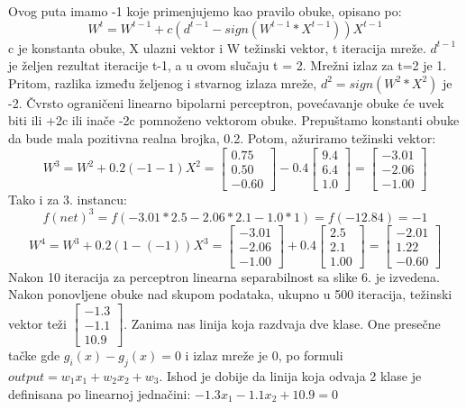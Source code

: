 \documentclass[fontsize=11bp, paper=a4]{scrarticle}
\begin{document}
Ovog puta imamo -1 koje primenjujemo kao pravilo obuke, opisano po:
$$
\boxed{
W^t = W^{t-1} + c(d^{t-1} - sign(W^{t-1}*X^{t-1})) X^{t-1}
}
$$
c je konstanta obuke, X ulazni vektor i W težinski vektor, t iteracija mreže. $d^{t-1}$ je željen rezultat iteracije t-1, a u ovom slučaju t = 2. Mrežni izlaz za t=2 je 1. Pritom, razlika između željenog i stvarnog izlaza mreže, $d^2 = sign(W^2 * X^2)$ je -2. Čvrsto ograničeni linearno bipolarni perceptron, povećavanje obuke će uvek biti ili +2c ili inače -2c pomnoženo vektorom obuke. Prepuštamo konstanti obuke da bude mala pozitivna realna brojka, 0.2. Potom, ažuriramo težinski vektor:
$$
W^3 = W^2 + 0.2 (-1 - 1)X^2 = \begin{bmatrix} 0.75 \\ 0.50 \\ -0.60 \end{bmatrix} - 0.4 \begin{bmatrix} 9.4 \\ 6.4 \\ 1.0 \end{bmatrix} = \begin{bmatrix} -3.01 \\ -2.06 \\ -1.00 \end{bmatrix}
$$
Tako i za 3. instancu:
$$
f(net)^3 = f(-3.01*2.5 - 2.06*2.1 - 1.0*1) = f(-12.84) = -1
$$
$$
W^4 = W^3 + 0.2(1 - (-1))X^3 = \begin{bmatrix} -3.01 \\ -2.06 \\ -1.00 \end{bmatrix} + 0.4\begin{bmatrix} 2.5 \\ 2.1 \\ 1.00 \end{bmatrix} = \begin{bmatrix} -2.01 \\ 1.22 \\ -0.60 \end{bmatrix}
$$
Nakon 10 iteracija za perceptron linearna separabilnost sa slike 6. je izvedena. Nakon ponovljene obuke nad skupom podataka, ukupno u 500 iteracija, težinski vektor teži $\begin{bmatrix} -1.3 \\ -1.1 \\ 10.9 \end{bmatrix}$. Zanima nas linija koja razdvaja dve klase. One presečne tačke gde $g_i(x) - g_j(x) = 0$ i izlaz mreže je 0, po formuli $output = w_1x_1 + w_2x_2 + w_3$.
Ishod je dobije da linija koja odvaja 2 klase je definisana po linearnoj jednačini: $-1.3x_1 - 1.1x_2 + 10.9 = 0$
\end{document}
